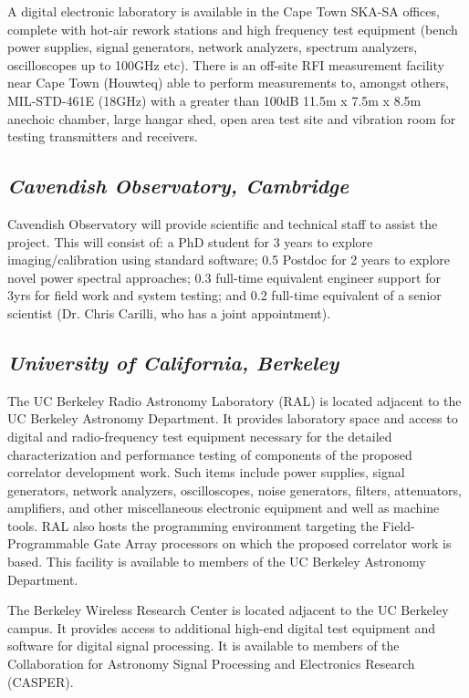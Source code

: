 \documentclass[11pt]{article}
\begin{document}
A digital electronic laboratory is available in the Cape Town SKA-SA offices,
complete with hot-air rework stations and high frequency test equipment
(bench power supplies, signal generators, network analyzers, spectrum
analyzers, oscilloscopes up to 100GHz etc). There is an off-site RFI
measurement facility near Cape Town (Houwteq) able to perform measurements to,
amongst others, MIL-STD-461E (18GHz) with a greater than 100dB 11.5m x 7.5m x
8.5m anechoic chamber, large hangar shed, open area test site and vibration
room for testing transmitters and receivers.

\subsection*{\it Cavendish Observatory, Cambridge}

Cavendish Observatory will provide scientific and technical staff to assist the project.  This will consist of:
a PhD student for 3 years to explore imaging/calibration using standard software; 
0.5 Postdoc for 2 years to explore novel power spectral approaches; 
0.3 full-time equivalent engineer support for 3yrs for field work and system testing; and 
0.2 full-time equivalent of a senior scientist (Dr. Chris Carilli, who has a joint appointment).

\subsection*{\it University of California, Berkeley}

The UC Berkeley Radio Astronomy Laboratory (RAL) is located adjacent to the UC
Berkeley Astronomy Department. It provides laboratory space and access to
digital and radio-frequency test equipment necessary for the detailed
characterization and performance testing of components of the proposed correlator
development work. Such items include power supplies, signal generators, network
analyzers, oscilloscopes, noise generators, filters, attenuators, amplifiers,
and other miscellaneous electronic equipment and well as machine tools. RAL also hosts the programming
environment targeting the Field-Programmable Gate Array processors on which the
proposed correlator work is based. This facility is available to members of the
UC Berkeley Astronomy Department.

The Berkeley Wireless Research Center is located adjacent to the UC Berkeley
campus. It provides access to additional high-end digital test equipment and
software for digital signal processing.  It is available to members of the
Collaboration for Astronomy Signal Processing and Electronics Research (CASPER).
\end{document}

